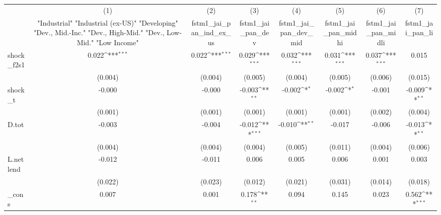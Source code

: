 {
\def\sym#1{\ifmmode^{#1}\else\(^{#1}\)\fi}
\begin{tabular}{l*{7}{c}}
\toprule
            &\multicolumn{1}{c}{(1)}&\multicolumn{1}{c}{(2)}&\multicolumn{1}{c}{(3)}&\multicolumn{1}{c}{(4)}&\multicolumn{1}{c}{(5)}&\multicolumn{1}{c}{(6)}&\multicolumn{1}{c}{(7)}\\
            &\multicolumn{1}{c}{ "Industrial" "Industrial (ex-US)" "Developing" "Dev., Mid.-Inc." "Dev., High-Mid."  "Dev., Low-Mid." "Low Income" }&\multicolumn{1}{c}{fstm1\_jai\_pan\_ind\_ex\_us}&\multicolumn{1}{c}{fstm1\_jai\_pan\_dev}&\multicolumn{1}{c}{fstm1\_jai\_pan\_dev\_mid}&\multicolumn{1}{c}{fstm1\_jai\_pan\_midhi}&\multicolumn{1}{c}{fstm1\_jai\_pan\_midli}&\multicolumn{1}{c}{fstm1\_jai\_pan\_li}\\
\midrule
shock\_f2s1  &       0.022\sym{***}&       0.022\sym{***}&       0.029\sym{***}&       0.032\sym{***}&       0.031\sym{***}&       0.037\sym{***}&       0.015         \\
            &     (0.004)         &     (0.004)         &     (0.005)         &     (0.004)         &     (0.005)         &     (0.006)         &     (0.015)         \\
\addlinespace
shock\_t     &      -0.000         &      -0.000         &      -0.003\sym{**} &      -0.002\sym{*}  &      -0.002\sym{*}  &      -0.001         &      -0.009\sym{**} \\
            &     (0.001)         &     (0.001)         &     (0.001)         &     (0.001)         &     (0.001)         &     (0.002)         &     (0.004)         \\
\addlinespace
D.tot       &      -0.003         &      -0.004         &      -0.012\sym{***}&      -0.010\sym{**} &      -0.017         &      -0.006         &      -0.013\sym{**} \\
            &     (0.004)         &     (0.004)         &     (0.004)         &     (0.005)         &     (0.011)         &     (0.004)         &     (0.006)         \\
\addlinespace
L.netlend   &      -0.012         &      -0.011         &       0.006         &       0.005         &       0.006         &       0.001         &       0.003         \\
            &     (0.022)         &     (0.023)         &     (0.012)         &     (0.021)         &     (0.031)         &     (0.014)         &     (0.018)         \\
\addlinespace
\_cons      &       0.007         &       0.001         &       0.178\sym{**} &       0.094         &       0.145         &       0.023         &       0.562\sym{***}\\

\end{tabular}}
